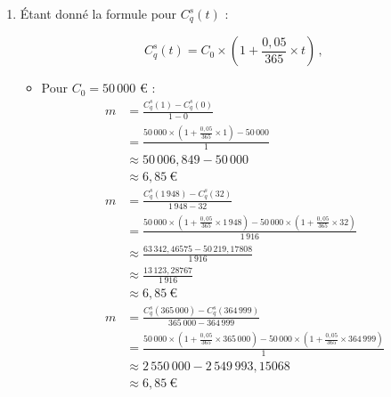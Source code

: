 \documentclass{article}
\begin{document}
\begin{enumerate}[label=\textbf{R1.\arabic*}]
    \item Étant donné la formule pour \( C_q^s(t) \) :

    \[
    C_q^s(t) = C_0 \times \left(1 + \frac{0{,}05}{365} \times t\right)\,,
    \]

    \begin{itemize}
        \item Pour \( C_0 = 50\,000 \) € :
        \[
            \begin{aligned}
            m &= \frac{C^s_q(1) - C^s_q(0)}{1 - 0} \\
              &= \frac{50\,000 \times \left(1 + \frac{0{,}05}{365} \times 1\right) - 50\,000}{1} \\
              &\approx 50\,006{,}849 - 50\,000 \\
              &\approx 6{,}85\ \text{€} \\[1em]
            m &= \frac{C^s_q(1\,948) - C^s_q(32)}{1\,948 - 32} \\
              &= \frac{50\,000 \times \left(1 + \frac{0{,}05}{365} \times 1\,948\right) - 50\,000 \times \left(1 + \frac{0{,}05}{365} \times 32\right)}{1\,916} \\
              &\approx \frac{63\,342{,}46575 - 50\,219{,}17808}{1\,916} \\
              &\approx \frac{13\,123{,}28767}{1\,916} \\
              &\approx 6{,}85\ \text{€} \\[1em]
            m &= \frac{C^s_q(365\,000) - C^s_q(364\,999)}{365\,000 - 364\,999} \\
              &= \frac{50\,000 \times \left(1 + \frac{0{,}05}{365} \times 365\,000\right) - 50\,000 \times \left(1 + \frac{0{,}05}{365} \times 364\,999\right)}{1} \\
              &\approx 2\,550\,000 - 2\,549\,993,15068 \\
              &\approx 6{,}85\ \text{€}
            \end{aligned}
        \]
    

\end{itemize}
\end{enumerate}
\end{document}
